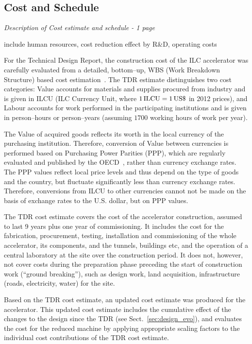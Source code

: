 
\subsection{Cost and Schedule}

{\it 
Description of Cost estimate and schedule - 1 page 

include human resources, cost reduction effect by R\&D, operating costs
}

For the Technical Design Report, the construction cost of the ILC accelerator was carefully evaluated from a detailed, bottom--up, WBS (Work Breakdown Structure) based cost estimation~\cite[Sect. 15]{Adolphsen:2013kya}.
The TDR estimate distinguishes two cost categories: Value accounts for materials and supplies procured from industry and is given in ILCU (ILC Currency Unit, where $1\,{\mathrm{ILCU}} = 1\,{\mathrm{US\$}}$ in 2012 prices), and Labour accounts for work performed in the participating institutions and is given in person--hours or person--years (assuming $1700$ working hours of work per year).

The Value of acquired goods reflects its worth in the local currency of the purchasing institution. 
Therefore, conversion of Value between currencies is performed based on Purchasing Power Parities (PPP), which are regularly evaluated and published by the OECD~\cite{OECD:2018,Eurostat:2012}, rather than currency exchange rates. 
The PPP values reflect local price levels and thus depend on the type of goods and the country, but fluctuate significantly less than currency exchange rates.
Therefore, conversions from ILCU to other currencies cannot not be made on the basis of exchange rates to the U.S. dollar, but on PPP values.

The TDR cost estimate covers the cost of the accelerator construction, assumed to last 9 years plus one year of commissioning. 
It includes the cost for the fabrication, procurement, testing, installation and commissioning of the whole accelerator, its components, and the tunnels, buildings etc, and the operation of a central laboratory at the site over the construction period. 
It does not, however, not cover costs during the preparation phase preceding the start of construction work (``ground breaking''), such as design work, land acquisition, infrastructure (roads, electricity, water) for the site.

Based on the TDR cost estimate, an updated cost estimate was produced for the  accelerator. 
This updated cost estimate includes the cumulative effect of the changes to the design since the TDR (see Sect.~\ref{sec:design_evo}), and evaluates the cost for the reduced machine by applying appropriate scaling factors to the individual cost contributions of the TDR cost estimate.

